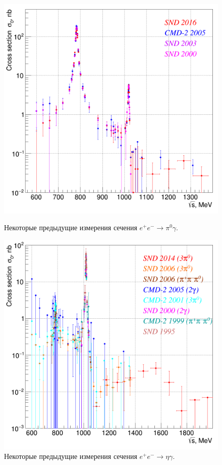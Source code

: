 \begin{figure}[htbp]
	\begin{minipage}[T]{.48\textwidth}
		\centering
		\includegraphics[width=\textwidth]{img/cs_pi0g_550_1400.png}
		\caption{Некоторые предыдущие измерения сечения $e^+ e^- \to \pi^0 \gamma$.}\label{fig:cs_pi0g_prev}
	\end{minipage}
	\hfill
	\begin{minipage}[T]{.48\textwidth}
		\centering
		\includegraphics[width=\textwidth]{img/cs_etag_550_2000.png}
		\caption{Некоторые предыдущие измерения сечения $e^+ e^- \to \eta \gamma$.}\label{fig:cs_etag_prev}
	\end{minipage}
\end{figure}

